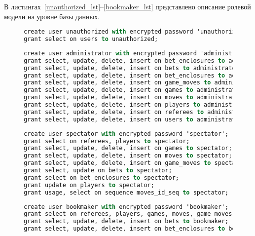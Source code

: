В листингах~\ref{unauthorized_lst}--\ref{bookmaker_lst} представлено описание ролевой модели на уровне базы данных.

\begin{figure}[H]
	\begin{lstlisting}[label=unauthorized_lst,caption=Описание роли неавторизованного пользователя,language=Caml]
create user unauthorized with encrypted password 'unauthorized';
grant select on users to unauthorized;
	\end{lstlisting}
\end{figure}
\begin{figure}[H]
	\begin{lstlisting}[label=administrator_lst,caption=Описание роли администратора,language=Caml]
create user administrator with encrypted password 'administrator';
grant select, update, delete, insert on bet_enclosures to administrator;
grant select, update, delete, insert on bets to administrator;
grant select, update, delete, insert on bet_enclosures to administrator;
grant select, update, delete, insert on game_moves to administrator;
grant select, update, delete, insert on games to administrator;
grant select, update, delete, insert on moves to administrator;
grant select, update, delete, insert on players to administrator;
grant select, update, delete, insert on referees to administrator;
grant select, update, delete, insert on users to administrator;
	\end{lstlisting}
\end{figure}
\begin{figure}[H]
	\begin{lstlisting}[label=spectator_lst,caption=Описание роли наблюдателя,language=Caml]
create user spectator with encrypted password 'spectator';
grant select on referees, players to spectator;
grant select, update, delete, insert on games to spectator;
grant select, update, delete, insert on moves to spectator;
grant select, update, delete, insert on game_moves to spectator;
grant select, update on bets to spectator;
grant select on bet_enclosures to spectator;
grant update on players to spectator;
grant usage, select on sequence moves_id_seq to spectator;
	\end{lstlisting}
\end{figure}
\begin{figure}[H]
	\begin{lstlisting}[label=bookmaker_lst,caption=Описание роли букмекера,language=Caml]
create user bookmaker with encrypted password 'bookmaker';
grant select on referees, players, games, moves, game_moves to bookmaker;
grant select, update, delete, insert on bets to bookmaker;
grant select, update, delete, insert on bet_enclosures to bookmaker;
	\end{lstlisting}
\end{figure}

